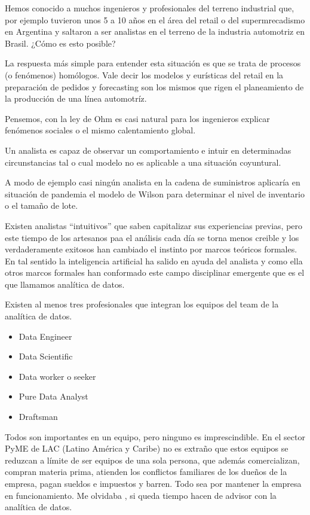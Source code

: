 \documentclass[]{article}
\providecommand{\tightlist}{%
  \setlength{\itemsep}{0pt}\setlength{\parskip}{0pt}}
\begin{document}
Hemos conocido a muchos ingenieros y profesionales del terreno
industrial que, por ejemplo tuvieron unos 5 a 10 años en el área del
retail o del supermrecadismo en Argentina y saltaron a ser analistas en
el terreno de la industria automotriz en Brasil. ¿Cómo es esto posible?

La respuesta más simple para entender esta situación es que se trata de
procesos (o fenómenos) homólogos. Vale decir los modelos y eurísticas
del retail en la preparación de pedidos y forecasting son los mismos que
rigen el planeamiento de la producción de una línea automotríz.

Pensemos, con la ley de Ohm es casi natural para los ingenieros explicar
fenómenos sociales o el mismo calentamiento global.

Un analista es capaz de observar un comportamiento e intuir en
determinadas circunstancias tal o cual modelo no es aplicable a una
situación coyuntural.

A modo de ejemplo casi ningún analista en la cadena de suministros
aplicaría en situación de pandemia el modelo de Wilson para determinar
el nivel de inventario o el tamaño de lote.

Existen analistas ``intuitivos'' que saben capitalizar sus experiencias
previas, pero este tiempo de los artesanos paa el análisis cada día se
torna menos creible y los verdaderamente exitosos han cambiado el
instinto por marcos teóricos formales. En tal sentido la inteligencia
artificial ha salido en ayuda del analista y como ella otros marcos
formales han conformado este campo disciplinar emergente que es el que
llamamos analítica de datos.

Existen al menos tres profesionales que integran los equipos del team de
la analítica de datos.

\begin{itemize}
\tightlist
\item
  Data Engineer
\item
  Data Scientific
\item
  Data worker o seeker
\item
  Pure Data Analyst
\item
  Draftsman
\end{itemize}

Todos son importantes en un equipo, pero ninguno es imprescindible. En
el sector PyME de LAC (Latino América y Caribe) no es extraño que estos
equipos se reduzcan a límite de ser equipos de una sola persona, que
además comercializan, compran materia prima, atienden los conflictos
familiares de los dueños de la empresa, pagan sueldos e impuestos y
barren. Todo sea por mantener la empresa en funcionamiento. Me olvidaba
, si queda tiempo hacen de advisor con la analítica de datos.
\end{document}
